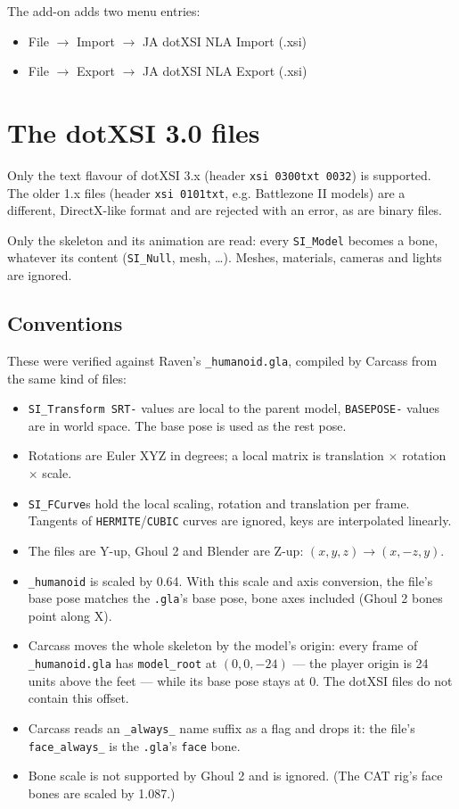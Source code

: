 \documentclass[a4paper,10pt]{article}
\begin{document}
 The add-on adds two menu entries:
 \begin{itemize}
  \item File $\rightarrow$ Import $\rightarrow$ JA dotXSI NLA Import (.xsi)
  \item File $\rightarrow$ Export $\rightarrow$ JA dotXSI NLA Export (.xsi)
 \end{itemize}

 \section{The dotXSI 3.0 files}

 Only the text flavour of dotXSI 3.x (header \texttt{xsi 0300txt 0032}) is supported. The older 1.x
 files (header \texttt{xsi 0101txt}, e.g. Battlezone II models) are a different, DirectX-like format
 and are rejected with an error, as are binary files.

 Only the skeleton and its animation are read: every \texttt{SI\_Model} becomes a bone, whatever its
 content (\texttt{SI\_Null}, mesh, \ldots). Meshes, materials, cameras and lights are ignored.

 \subsection{Conventions}

 These were verified against Raven's \texttt{\_humanoid.gla}, compiled by Carcass from the same kind
 of files:
 \begin{itemize}
  \item \texttt{SI\_Transform SRT-} values are local to the parent model, \texttt{BASEPOSE-} values are
  in world space. The base pose is used as the rest pose.
  \item Rotations are Euler XYZ in degrees; a local matrix is translation $\times$ rotation $\times$
  scale.
  \item \texttt{SI\_FCurve}s hold the local scaling, rotation and translation per frame. Tangents of
  \texttt{HERMITE}/\texttt{CUBIC} curves are ignored, keys are interpolated linearly.
  \item The files are Y-up, Ghoul 2 and Blender are Z-up: $(x, y, z) \rightarrow (x, -z, y)$.
  \item \texttt{\_humanoid} is scaled by 0.64. With this scale and axis conversion, the file's base
  pose matches the \texttt{.gla}'s base pose, bone axes included (Ghoul 2 bones point along X).
  \item Carcass moves the whole skeleton by the model's origin: every frame of \texttt{\_humanoid.gla}
  has \texttt{model\_root} at $(0, 0, -24)$ --- the player origin is 24 units above the feet --- while
  its base pose stays at 0. The dotXSI files do not contain this offset.
  \item Carcass reads an \texttt{\_always\_} name suffix as a flag and drops it: the file's
  \texttt{face\_always\_} is the \texttt{.gla}'s \texttt{face} bone.
  \item Bone scale is not supported by Ghoul 2 and is ignored. (The CAT rig's face bones are scaled
  by 1.087.)
 \end{itemize}
\end{document}
